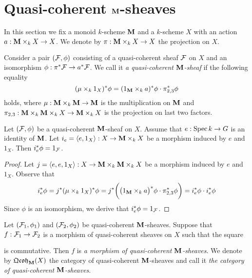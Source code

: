 \section{Quasi-coherent $\mathbf{M}$-sheaves}
\noindent
In this section we fix a monoid $k$-scheme $\mathbf{M}$ and a $k$-scheme $X$ with an action $a:\mathbf{M} \times_k X \rightarrow X$. We denote by $\pi: \mathbf{M}\times_kX\rightarrow X$ the projection on $X$.

\begin{definition}
Consider a pair $({\mathcal F},\phi)$ consisting of a quasi-coherent sheaf ${\mathcal F}$ on $X$ and an isomorphism $\phi:\pi^*{\mathcal F} \rightarrow a^* {\mathcal F}$. We call it \textit{a quasi-coherent $\mathbf{M}$-sheaf} if the following equality
$$(\mu\times_k1_X)^*\phi = (1_{\mathbf{M}} \times_k a)^*\phi \cdot \pi_{2,3}^*\phi$$
holds, where $\mu: \mathbf{M} \times_k \mathbf{M} \rightarrow \mathbf{M}$ is the multiplication on $\mathbf{M}$ and $\pi_{2,3}:\mathbf{M}\times_k \mathbf{M} \times_k X \rightarrow \mathbf{M} \times_kX$ is the projection on last two factors.
\end{definition}

\begin{proposition}\label{proposition:compatibility_with_identity}
Let $({\mathcal F},\phi)$ be a quasi-coherent $\mathbf{M}$-sheaf on $X$. Assume that $e:\mathrm{Spec}\, k\rightarrow G$ is an identity of $\mathbf{M}$. Let $i_e = \langle e, 1_X\rangle :X\rightarrow \mathbf{M} \times_kX$ be a morphism induced by $e$ and $1_X$. Then $i^*_e\phi = 1_{{\mathcal F}}$.
\end{proposition}
\begin{proof}
Let $j = \langle e, e, 1_X\rangle:X \rightarrow \mathbf{M} \times_k \mathbf{M} \times_kX$ be a morphism induced by $e$ and $1_X$. Observe that
$$i_e^*\phi=j^*(\mu\times_k1_X)^*\phi = j^* \bigg(\big(1_{\mathbf{M}} \times_k a\big)^*\phi \cdot \pi^*_{2,3}\phi\bigg)=i^*_e\phi \cdot i^*_e\phi$$
Since $\phi$ is an isomorphism, we derive that $i_e^*\phi=1_{{\mathcal F}}$.
\end{proof}

\begin{definition}
Let $({\mathcal F}_1,\phi_1)$ and $({\mathcal F}_2,\phi_2)$ be quasi-coherent $\mathbf{M}$-sheaves. Suppose that $f:{\mathcal F}_1\rightarrow {\mathcal F}_2$ is a morphism of quasi-coherent sheaves on $X$ such that the square
\begin{center}
\end{center}
is commutative. Then $f$ is \textit{a morphism of quasi-coherent $\mathbf{M}$-sheaves}. We denote by $\mathfrak{Qcoh}_{\mathbf{M}}(X)$ the category of quasi-coherent $\mathbf{M}$-sheaves and call it \textit{the category of quasi-coherent $\mathbf{M}$-sheaves}.
\end{definition}

